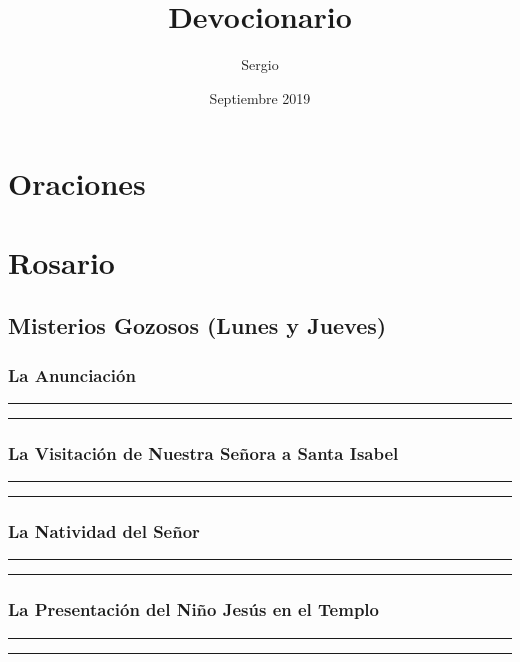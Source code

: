 \documentclass[11pt,a4paper]{report}
\title{Devocionario}
\author{Sergio}
\date{Septiembre 2019}
\begin{document}
\maketitle

\section*{Oraciones}


\section*{Rosario}
\subsection*{Misterios Gozosos (Lunes y Jueves)}
\subsubsection*{La Anunciación}


\rule{\textwidth}{0.5pt}

\rule{\textwidth}{0.5pt}


\subsubsection*{La Visitación de Nuestra Señora a Santa Isabel}


\rule{\textwidth}{0.5pt}

\rule{\textwidth}{0.5pt}


\subsubsection*{La Natividad del Señor}


\rule{\textwidth}{0.5pt}

\rule{\textwidth}{0.5pt}


\subsubsection*{La Presentación del Niño Jesús en el Templo}


\rule{\textwidth}{0.5pt}

\rule{\textwidth}{0.5pt}

\end{document}
